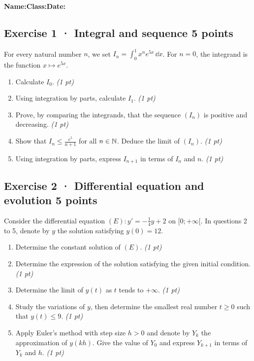 \smallskip\textbf{Name:}\enspace\dotfill\quad\textbf{Class:}\enspace\dotfill\quad\textbf{Date:}\enspace\dotfill

\subsection*{Exercise 1 · Integral and sequence \hfill 5 points}For every natural number $n$, we set $I_n=\displaystyle\int_0^1x^ne^{5x}\,\dd x$. For $n=0$, the integrand is the function $x\mapsto e^{5x}$.

\begin{enumerate}

\item Calculate $I_0$. \hfill\textit{(1 pt)}

\item Using integration by parts, calculate $I_1$. \hfill\textit{(1 pt)}

\item Prove, by comparing the integrands, that the sequence $(I_n)$ is positive and decreasing. \hfill\textit{(1 pt)}

\item Show that $I_n\le\frac{e^{5}}{n+1}$ for all $n\in\mathbb N$. Deduce the limit of $(I_n)$. \hfill\textit{(1 pt)}

\item Using integration by parts, express $I_{n+1}$ in terms of $I_n$ and $n$. \hfill\textit{(1 pt)}

\end{enumerate}

\subsection*{Exercise 2 · Differential equation and evolution \hfill 5 points}Consider the differential equation $(E):y'=-\frac1{4}y+2$ on $[0;+\infty[$. In questions 2 to 5, denote by $y$ the solution satisfying $y(0)=12$.

\begin{enumerate}

\item Determine the constant solution of $(E)$. \hfill\textit{(1 pt)}

\item Determine the expression of the solution satisfying the given initial condition. \hfill\textit{(1 pt)}

\item Determine the limit of $y(t)$ as $t$ tends to $+\infty$. \hfill\textit{(1 pt)}

\item Study the variations of $y$, then determine the smallest real number $t\ge0$ such that $y(t)\le9$. \hfill\textit{(1 pt)}

\item Apply Euler's method with step size $h>0$ and denote by $Y_k$ the approximation of $y(kh)$. Give the value of $Y_0$ and express $Y_{k+1}$ in terms of $Y_k$ and $h$. \hfill\textit{(1 pt)}

\end{enumerate}

